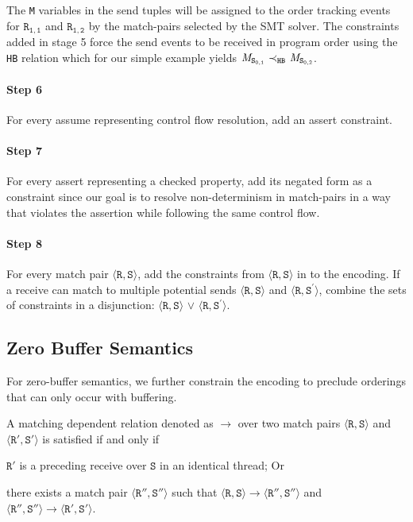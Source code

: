 The \texttt{M} variables in the send tuples will be assigned to the
order tracking events for $\mathtt{R_{1,1}}$ and $\mathtt{R_{1,2}}$ by
the match-pairs selected by the SMT solver. The constraints added in
stage 5 force the send events to be received in program order using
the \texttt{HB} relation which for our simple example yields
$\cfgnt{M}_\mathtt{S_{0,1}}\ \mathrm{\prec_\mathtt{HB}}\ \cfgnt{M}_\mathtt{S_{0,2}}$.

\paragraph*{Step 6} For every assume representing control flow
resolution, add an assert constraint.

\paragraph*{Step 7} For every assert representing a checked property,
add its negated form as a constraint since our goal is to resolve
non-determinism in match-pairs in a way that violates the assertion
while following the same control flow.

\paragraph*{Step 8} For every match pair $\langle\mathtt{R},
\mathtt{S}\rangle$, add the constraints from $\langle\mathtt{R},
\mathtt{S}\rangle$ in  to the encoding. If a receive
can match to multiple potential sends $\langle\mathtt{R},
\mathtt{S}\rangle$ and $\langle\mathtt{R}, \mathtt{S^\prime}\rangle$,
combine the sets of constraints in a disjunction: $\langle\mathtt{R},
\mathtt{S}\rangle$ $\vee$ $\langle\mathtt{R},
\mathtt{S^\prime}\rangle$.

\subsection{Zero Buffer Semantics}

For zero-buffer semantics, we further constrain the encoding to
preclude orderings that can only occur with buffering.

\begin{definition}
A matching dependent relation denoted as $\rightarrow$ over two match
pairs $\langle\mathtt{R}, \mathtt{S}\rangle$ and $\langle\mathtt{R'},
\mathtt{S'}\rangle$ is satisfied if and only if
\begin{compactenum}
\item $\mathtt{R'}$ is a preceding receive over $\mathtt{S}$ in an
  identical thread; Or
\item there exists a match pair $\langle\mathtt{R''},
  \mathtt{S''}\rangle$ such that $\langle\mathtt{R}, \mathtt{S}\rangle
  \rightarrow \langle\mathtt{R''}, \mathtt{S''}\rangle$ and
  $\langle\mathtt{R''}, \mathtt{S''}\rangle \rightarrow
  \langle\mathtt{R'}, \mathtt{S'}\rangle$.
\end{compactenum}
\end{definition}

